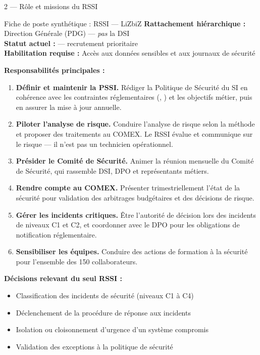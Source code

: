 \documentclass[12pt,a4paper]{article}
\begin{document}
\begin{boxarticle}{2 --- Rôle et missions du RSSI}

\begin{boxrole}{Fiche de poste synthétique : RSSI --- LiZbiZ}
\textbf{Rattachement hiérarchique :} Direction Générale (PDG) ---
\textit{pas} la DSI\\
\textbf{Statut actuel :} \statutVacant{} --- recrutement prioritaire\\
\textbf{Habilitation requise :} Accès aux données sensibles et aux
journaux de sécurité

\vspace{0.5em}
\textbf{\color{ChartePrimaire}Responsabilités principales :}
\begin{enumerate}
    \item \textbf{Définir et maintenir la PSSI.} Rédiger la Politique de
    Sécurité du SI en cohérence avec les contraintes réglementaires
    (, ) et les objectifs métier, puis en
    assurer la mise à jour annuelle.

    \item \textbf{Piloter l'analyse de risque.} Conduire l'analyse de
    risque selon la méthode  et proposer des traitements
    au COMEX. Le RSSI évalue et communique sur le risque --- il n'est pas
    un technicien opérationnel.

    \item \textbf{Présider le Comité de Sécurité.} Animer la réunion
    mensuelle du Comité de Sécurité, qui rassemble DSI, DPO et
    représentants métiers.

    \item \textbf{Rendre compte au COMEX.} Présenter trimestriellement
    l'état de la sécurité pour validation des arbitrages budgétaires et
    des décisions de risque.

    \item \textbf{Gérer les incidents critiques.} Être l'autorité de
    décision lors des incidents de niveaux C1 et C2, et coordonner avec
    le DPO pour les obligations de notification réglementaire.

    \item \textbf{Sensibiliser les équipes.} Conduire des actions de
    formation à la sécurité pour l'ensemble des 150 collaborateurs.
\end{enumerate}

\vspace{0.4em}
\textbf{\color{ChartePrimaire}Décisions relevant du seul RSSI :}
\begin{itemize}
    \item Classification des incidents de sécurité (niveaux C1 à C4)
    \item Déclenchement de la procédure de réponse aux incidents
    \item Isolation ou cloisonnement d'urgence d'un système compromis
    \item Validation des exceptions à la politique de sécurité
\end{itemize}


\end{boxrole}
\end{boxarticle}
\end{document}
